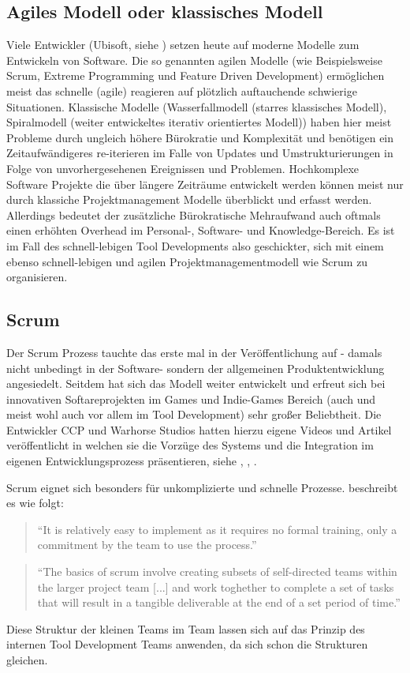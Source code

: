 \documentclass[pagesize, paper=a4, fontsize=12pt, titlepage=true, headings=small, headnosepline, abstractoff, liststotoc, nochapterprefix, plainheadsepline, twoside]{scrreprt}
\begin{document}
\subsection{Agiles Modell oder klassisches Modell}
Viele Entwickler (Ubisoft, siehe \cite{MKG:Schmitz2014}) setzen heute auf moderne Modelle zum Entwickeln von Software. Die so genannten agilen Modelle (wie Beispielsweise Scrum,  Extreme Programming und Feature Driven Development) ermöglichen meist das schnelle (agile) reagieren auf plötzlich auftauchende schwierige Situationen. Klassische Modelle (Wasserfallmodell (starres klassisches Modell), Spiralmodell (weiter entwickeltes iterativ orientiertes Modell)) haben hier meist Probleme durch ungleich höhere Bürokratie und Komplexität und benötigen ein Zeitaufwändigeres re-iterieren im Falle von Updates und Umstrukturierungen in Folge von unvorhergesehenen Ereignissen und Problemen. Hochkomplexe Software Projekte die über längere Zeiträume entwickelt werden können meist nur durch klassiche Projektmanagement Modelle überblickt und erfasst werden. Allerdings bedeutet der zusätzliche Bürokratische Mehraufwand auch oftmals einen erhöhten Overhead im Personal-, Software- und Knowledge-Bereich. Es ist im Fall des schnell-lebigen Tool Developments also geschickter, sich mit einem ebenso schnell-lebigen und agilen Projektmanagementmodell wie Scrum zu organisieren.

\subsection{Scrum}
Der Scrum Prozess tauchte das erste mal in der Veröffentlichung  auf - damals nicht unbedingt in der Software- sondern der allgemeinen Produktentwicklung angesiedelt. Seitdem hat sich das Modell weiter entwickelt und erfreut sich bei innovativen Softareprojekten im Games und Indie-Games Bereich (auch und meist wohl auch vor allem im Tool Development) sehr großer Beliebtheit. Die Entwickler CCP und Warhorse Studios hatten hierzu eigene Videos und Artikel veröffentlicht in welchen sie die Vorzüge des Systems und die Integration im eigenen Entwicklungsprozess präsentieren, siehe \cite{CCP:ScrumAndAgile2009}, \cite{WH:Scrum2013}, \cite{WH:ScrumVideo2013}.

Scrum eignet sich besonders für unkomplizierte und schnelle Prozesse. \autocite{Chandler2006} beschreibt es wie folgt:
\begin{quote}
“It is relatively easy to implement as it requires no formal training, only a commitment by the team to use the process.”
\cite[S. 45]{Chandler2006}
\end{quote}
\begin{quote}
“The basics of scrum involve creating subsets of self-directed teams within the larger project team [...] and work toghether to complete a set of tasks that will result in a tangible deliverable at the end of a set period of time.”
\cite[S. 45]{Chandler2006}
\end{quote}
Diese Struktur der kleinen Teams im Team lassen sich auf das Prinzip des internen Tool Development Teams anwenden, da sich schon die Strukturen gleichen.
\end{document}
